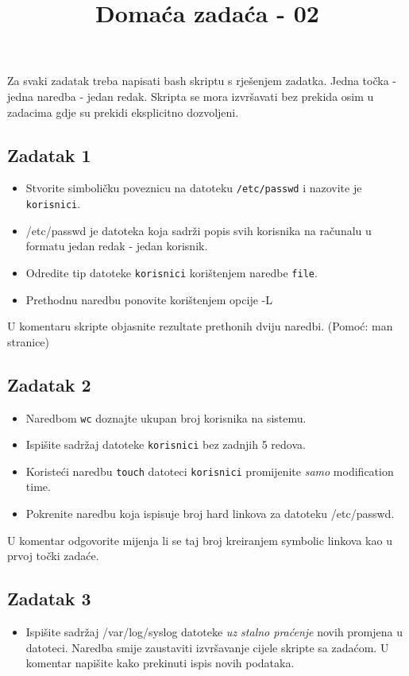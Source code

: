 \documentclass[12pt,a4paper]{article}
\newcommand{\shell}[1]{\texttt{#1}}
\begin{document}
	\title{Domaća zadaća - 02\vspace{-2em}}
	\maketitle
	Za svaki zadatak treba napisati bash skriptu s rješenjem zadatka. Jedna točka - jedna naredba - jedan redak. Skripta se mora izvršavati bez prekida osim u zadacima gdje su prekidi eksplicitno dozvoljeni.
	\subsection*{Zadatak 1}
	\begin{itemize}
		\item Stvorite simboličku poveznicu na datoteku \shell{/etc/passwd} i nazovite je \shell{korisnici}.
		\item[] /etc/passwd je datoteka koja sadrži popis svih korisnika na računalu u formatu jedan redak - jedan korisnik.
		\item Odredite tip datoteke \shell{korisnici} korištenjem naredbe \shell{file}.
		\item Prethodnu naredbu ponovite korištenjem opcije -L
	\end{itemize}
	U komentaru skripte objasnite rezultate prethonih dviju naredbi. (Pomoć: man stranice)
	\subsection*{Zadatak 2}
	\begin{itemize}
		\item Naredbom \shell{wc} doznajte ukupan broj korisnika na sistemu.
		\item Ispišite sadržaj datoteke \shell{korisnici} bez zadnjih 5 redova.
		\item Koristeći naredbu \shell{touch} datoteci \shell{korisnici} promijenite \emph{samo} modification time.
		\item Pokrenite naredbu koja ispisuje broj hard linkova za datoteku /etc/passwd.
	\end{itemize}
	U komentar odgovorite mijenja li se taj broj kreiranjem symbolic linkova kao u prvoj točki zadaće.
	\subsection*{Zadatak 3}
	\begin{itemize}
		\item Ispišite sadržaj /var/log/syslog datoteke \emph{uz stalno praćenje} novih promjena u datoteci. Naredba smije zaustaviti izvršavanje cijele skripte sa zadaćom. U komentar napišite kako prekinuti ispis novih podataka.
	\end{itemize}
\end{document}
